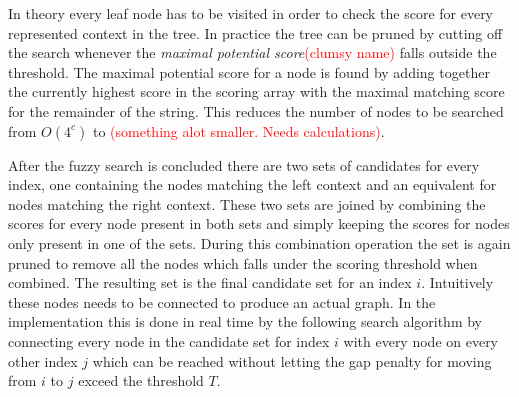 \documentclass{article}
\begin{document}
In theory every leaf node has to be visited in order to check the score for every represented context in the tree. In practice the tree can be pruned by cutting off the search whenever the \textit{maximal potential score}\textcolor{red}{(clumsy name)} falls outside the threshold. The maximal potential score for a node is found by adding together the currently highest score in the scoring array with the maximal matching score for the remainder of the string. This reduces the number of nodes to be searched from $O(4^c)$ to \textcolor{red}{(something alot smaller. Needs calculations)}.\\
\par\noindent
After the fuzzy search is concluded there are two sets of candidates for every index, one containing the nodes matching the left context and an equivalent for nodes matching the right context. These two sets are joined by combining the scores for every node present in both sets and simply keeping the scores for nodes only present in one of the sets. During this combination operation the set is again pruned to remove all the nodes which falls under the scoring threshold when combined. The resulting set is the final candidate set for an index $i$. Intuitively these nodes needs to be connected to produce an actual graph. In the implementation this is done in real time by the following search algorithm by connecting every node in the candidate set for index $i$ with every node on every other index $j$ which can be reached without letting the gap penalty for moving from $i$ to $j$ exceed the threshold $T$.
\end{document}

